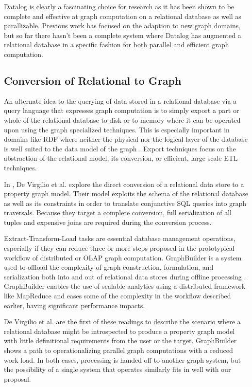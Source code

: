 \documentclass[11pt,letterpaper]{article}
\begin{document}
Datalog is clearly a fascinating choice for research as it has been shown to be complete and effective at graph computation on a relational database as well as parallizable. Previous work has focused on the adaption to new graph domains, but so far there hasn't been a complete system where Datalog has augmented a relational database in a specific fashion for both parallel and efficient graph computation.

\subsection*{Conversion of Relational to Graph}

An alternate idea to the querying of data stored in a relational database via a query language that expresses graph computation is to simply export a part or whole of the relational database to disk or to memory where it can be operated upon using the graph specialized techniques. This is especially important in domains like RDF where neither the physical nor the logical layer of the database is well suited to the data model of the graph \cite{hert_comparison_2011}. Export techniques focus on the abstraction of the relational model, its conversion, or efficient, large scale ETL techniques.

In \cite{de_virgilio_converting_2013}, De Virgilio et al. explore the direct conversion of a relational data store to a property graph model. Their model exploits the schema of the relational database as well as its constraints in order to translate conjunctive SQL queries into graph traversals. Because they target a complete conversion, full serialization of all tuples and expensive joins are required during the conversion process.

Extract-Transform-Load tasks are essential database management operations, especially if they can reduce three or more steps proposed in the prototypical workflow of distributed or OLAP graph computation. GraphBuilder is a system used to offload the complexity of graph construction, formulation, and serialization both into and out of relational data stores during offline processing \cite{jain_graphbuilder:_2013}. GraphBuilder enables the use of scalable analytics using a distributed framework like MapReduce and eases some of the complexity in the workflow described earlier, having significant performance impacts.

De Virgilio et al. are the first of these readings to describe the scenario where a relational database might be introspected to produce a property graph model with little definitional requirements from the user or the target. GraphBuilder shows a path to operationalizing parallel graph computations with a reduced work load. In both cases, processing is handed off to another graph system, but the possibility of a single system that operates similarly fits in well with our proposal.
\end{document}
